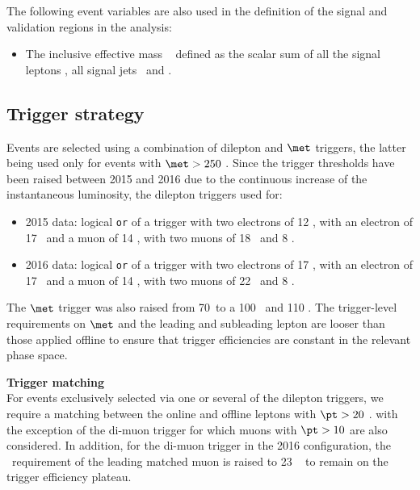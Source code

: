 The following event variables are also used in the definition of the signal and validation regions in the analysis:
\begin{itemize}
\item The inclusive effective mass \meff~ defined as the scalar sum of
  all the signal leptons \pt , all signal jets \pt\ and \met. 
\end{itemize}

\subsection{Trigger strategy}
\label{subsec:sec.strategy.sel.selection_trigger}
  
Events are selected using a combination of dilepton and $\met$ triggers, the latter being used only for events with $\met>250$ \GeV. 
Since the trigger thresholds have been raised between 2015 and 2016 due to the 
continuous increase of the instantaneous luminosity, 
the dilepton triggers used for: 
\begin{itemize}
\item 2015 data:
logical \texttt{or} of a trigger with two electrons of 12 \GeV, 
with an electron of 17 \GeV~and a muon of 14 \GeV,
with two muons of 18 \GeV~and 8 \GeV. 
\item 2016 data:
logical \texttt{or} of a trigger with two electrons of 17 \GeV, 
with an electron of 17 \GeV~and a muon of 14 \GeV,
with two muons of 22 \GeV~and 8 \GeV. 
\end{itemize}
The $\met$ trigger was also raised from 70\GeV~to a 100 \GeV~and 110 \GeV.
The trigger-level requirements on $\met$ and the leading and subleading lepton \pt are looser than those applied offline 
to ensure that trigger efficiencies are constant in the relevant phase space.


\par{\bfseries Trigger matching\\}
For events exclusively selected via one or several of the dilepton triggers, 
we require a matching between the online and offline leptons with $\pt>20$ \GeV.
with the exception of the di-muon trigger for which muons with $\pt>10$ \GeV 
are also considered.
In addition, for the di-muon trigger in the 2016 configuration, 
the \pt\ requirement of the leading matched muon is raised to 23 \GeV~
to remain on the trigger efficiency plateau. 

